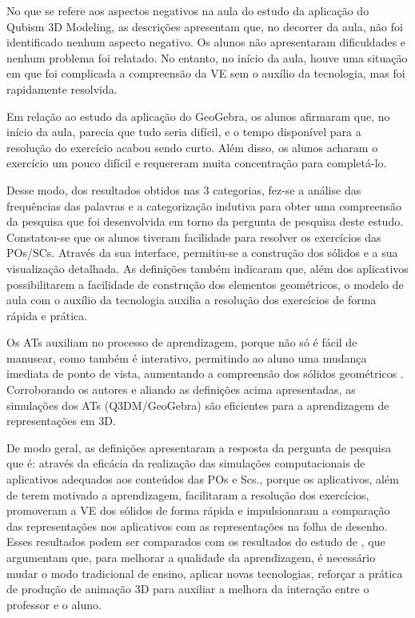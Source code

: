 No que se refere aos aspectos negativos na aula do estudo da aplicação
do Qubism 3D Modeling, as descrições apresentam que, no decorrer da
aula, não foi identificado nenhum aspecto negativo. Os alunos não
apresentaram dificuldades e nenhum problema foi relatado. No entanto, no
início da aula, houve uma situação em que foi complicada a compreensão
da VE sem o auxílio da tecnologia, mas foi rapidamente resolvida.

Em relação ao estudo da aplicação do GeoGebra, os alunos afirmaram que,
no início da aula, parecia que tudo seria difícil, e o tempo disponível
para a resolução do exercício acabou sendo curto. Além disso, os alunos
acharam o exercício um pouco difícil e requereram muita concentração
para completá-lo.

Desse modo, dos resultados obtidos nas 3 categorias, fez-se a análise
das frequências das palavras e a categorização indutiva para obter uma
compreensão da pesquisa que foi desenvolvida em torno da pergunta de
pesquisa deste estudo. Constatou-se que os alunos tiveram facilidade
para resolver os exercícios das POs/SCs. Através da sua interface,
permitiu-se a construção dos sólidos e a sua visualização detalhada. As
definições também indicaram que, além dos aplicativos possibilitarem a
facilidade de construção dos elementos geométricos, o modelo de aula com
o auxílio da tecnologia auxilia a resolução dos exercícios de forma
rápida e prática.

Os ATs auxiliam no processo de aprendizagem, porque não só é fácil de
manusear, como também é interativo, permitindo ao aluno uma mudança
imediata de ponto de vista, aumentando a compreensão dos sólidos
geométricos \cite[p. 220]{mexas2015}. Corroborando os autores e
aliando as definições acima apresentadas, as simulações dos ATs
(Q3DM/GeoGebra) são eficientes para a aprendizagem de representações em
3D.

De modo geral, as definições apresentaram a resposta da pergunta de
pesquisa que é: através da eficácia da realização das simulações
computacionais de aplicativos adequados aos conteúdos das POs e Scs.,
porque os aplicativos, além de terem motivado a aprendizagem,
facilitaram a resolução dos exercícios, promoveram a VE dos sólidos de
forma rápida e impulsionaram a comparação das representações nos
aplicativos com as representações na folha de desenho. Esses resultados
podem ser comparados com os resultados do estudo de \cite[p. 154]{qin2018},
que argumentam que, para melhorar a qualidade da aprendizagem, é
necessário mudar o modo tradicional de ensino, aplicar novas
tecnologias, reforçar a prática de produção de animação 3D para auxiliar
a melhora da interação entre o professor e o aluno.

